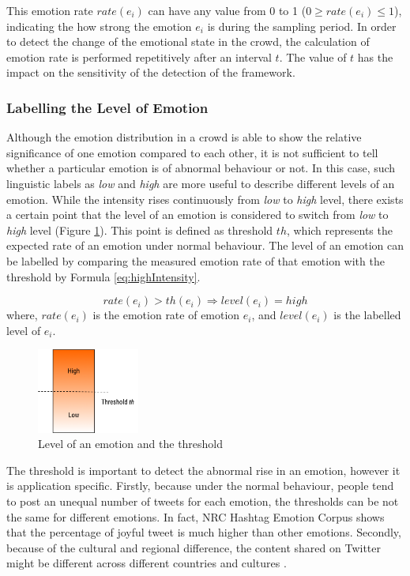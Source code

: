 This emotion rate \(rate(e_i)\) can have any value from 0 to 1 (\(0 \geq rate(e_i) \leq 1\)), indicating the how strong the emotion \(e_i\) is during the sampling period. In order to detect the change of the emotional state in the crowd, the calculation of emotion rate is performed repetitively after an interval \(t\). The value of \(t\) has the impact on the sensitivity of the detection of the framework.

\subsubsection{Labelling the Level of Emotion}
Although the emotion distribution in a crowd is able to show the relative significance of one emotion compared to each other, it is not sufficient to tell whether a particular emotion is of abnormal behaviour or not. In this case, such linguistic labels as \textit{low} and \textit{high} are more useful to describe different levels of an emotion. While the intensity rises continuously from \textit{low} to \textit{high} level, there exists a certain point that the level of an emotion is considered to switch from \textit{low} to \textit{high} level (Figure \ref{fig:levelOfDensity}). This point is defined as threshold \(th\), which represents the expected rate of an emotion under normal behaviour. The level of an emotion can be labelled by comparing the measured emotion rate of that emotion with the threshold by Formula \ref{eq:highIntensity}.

\begin{equation}
\label{eq:highIntensity}
	rate(e_i) > th(e_i) \Rightarrow level(e_i) = high
\end{equation}
where, \(rate(e_i)\) is the emotion rate of emotion \(e_i\), and \(level(e_i)\) is the labelled level of \(e_i\).

\begin{figure}[htb!] 
\centering    
\includegraphics[width=0.3\textwidth]{LevelOfEmotion}
\caption{Level of an emotion and the threshold}
\label{fig:levelOfDensity}
\end{figure}

The threshold is important to detect the abnormal rise in an emotion, however it is application specific. Firstly, because under the normal behaviour, people tend to post an unequal number of tweets for each emotion, the thresholds can be not the same for different emotions. In fact, NRC Hashtag Emotion Corpus \citep{mohammad2014using} shows that the percentage of joyful tweet is much higher than other emotions. Secondly, because of the cultural and regional difference, the content shared on Twitter might be different across different countries and cultures \citep{Larsen2015}. 

